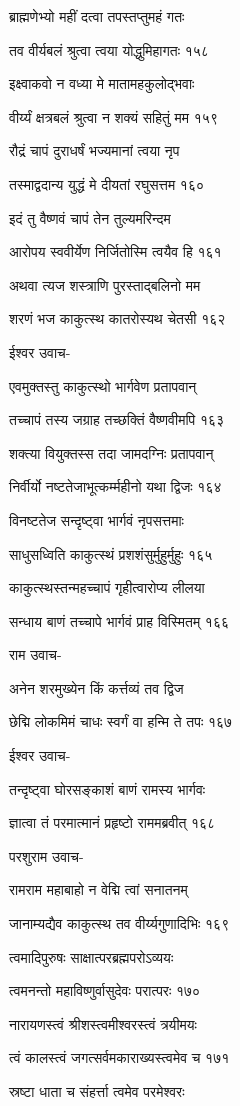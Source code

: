 ब्राह्मणेभ्यो महीं दत्वा तपस्तप्तुमहं गतः

तव वीर्यबलं श्रुत्वा त्वया योद्धुमिहागतः १५८

इक्ष्वाकवो न वध्या मे मातामहकुलोद्भवाः

वीर्य्यं क्षत्रबलं श्रुत्वा न शक्यं सहितुं मम १५९

रौद्रं चापं दुराधर्षं भज्यमानां त्वया नृप

तस्माद्वदान्य युद्धं मे दीयतां रघुसत्तम १६०

इदं तु वैष्णवं चापं तेन तुल्यमरिन्दम

आरोपय स्ववीर्येण निर्जितोस्मि त्वयैव हि १६१

अथवा त्यज शस्त्राणि पुरस्ताद्बलिनो मम

शरणं भज काकुत्स्थ कातरोस्यथ चेतसी १६२

ईश्वर उवाच-

एवमुक्तस्तु काकुत्स्थो भार्गवेण प्रतापवान्

तच्चापं तस्य जग्राह तच्छक्तिं वैष्णवीमपि १६३

शक्त्या वियुक्तस्स तदा जामदग्निः प्रतापवान्

निर्वीर्यो नष्टतेजाभूत्कर्म्महीनो यथा द्विजः १६४

विनष्टतेज सन्दृष्ट्वा भार्गवं नृपसत्तमाः

साधुसध्विति काकुत्स्थं प्रशशंसुर्मुहुर्मुहुः १६५

काकुत्स्थस्तन्महच्चापं गृहीत्वारोप्य लीलया

सन्धाय बाणं तच्चापे भार्गवं प्राह विस्मितम् १६६

राम उवाच-

अनेन शरमुख्येन किं कर्त्तव्यं तव द्विज

छेद्मि लोकमिमं चाधः स्वर्गं वा हन्मि ते तपः १६७

ईश्वर उवाच-

तन्दृष्ट्वा घोरसङ्काशं बाणं रामस्य भार्गवः

ज्ञात्वा तं परमात्मानं प्रहृष्टो राममब्रवीत् १६८

परशुराम उवाच-

रामराम महाबाहो न वेद्मि त्वां सनातनम्

जानाम्यद्यैव काकुत्स्थ तव वीर्य्यगुणादिभिः १६९

त्वमादिपुरुषः साक्षात्परब्रह्मपरोऽव्ययः

त्वमनन्तो महाविष्णुर्वासुदेवः परात्परः १७०

नारायणस्त्वं श्रीशस्त्वमीश्वरस्त्वं त्रयीमयः

त्वं कालस्त्वं जगत्सर्वमकाराख्यस्त्वमेव च १७१

स्रष्टा धाता च संहर्त्ता त्वमेव परमेश्वरः

